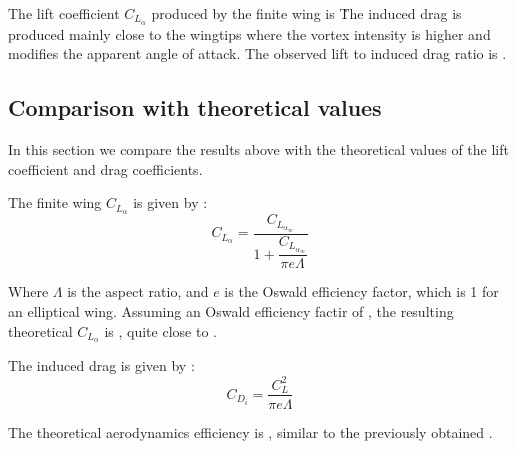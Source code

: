 

The lift coefficient $C_{L_\alpha}$ produced by the finite wing is \clalpha{} \. The induced drag is produced mainly close to the wingtips where the vortex intensity is higher and modifies the apparent angle of attack. The observed lift to induced drag ratio is \lifttodrag{}.

\subsection{Comparison with theoretical values}
In this section we compare the results above with the theoretical values of the lift coefficient and drag coefficients.

The finite wing $C_{L_\alpha}$ is given by \cite[eqn 73]{leishman}:
\begin{equation}
    C_{L_\alpha}= \frac{C_{L_{\alpha_\infty}}}{1 + \dfrac{C_{L_{\alpha_\infty}}}{\pi e \Lambda}}
\end{equation}

Where $\Lambda$ is the aspect ratio, and $e$ is the Oswald efficiency factor, which is 1 for an elliptical wing. Assuming an Oswald efficiency factir of \efficiency{}, the resulting theoretical $C_{L_\alpha}$ is \clalphatheory{}, quite close to \clalpha{}.

The induced drag is given by \cite[eqn 49]{leishman}:
\begin{equation}
    C_{D_{i}} = \frac{C_L^2}{\pi e \Lambda}
\end{equation}

The theoretical aerodynamics efficiency is \lifttodragtheory{}, similar to the previously obtained \lifttodrag{}.

\printbibliography[title={References}]